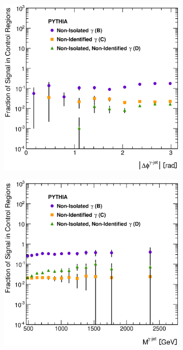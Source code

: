 \documentclass[12pt, twoside]{article}
\numberwithin{equation}{section}
\numberwithin{figure}{section}
\newenvironment{changemargin}[2]{%
\begin{list}{}{%
\setlength{\topsep}{0pt}%
\setlength{\leftmargin}{#1}%
\setlength{\rightmargin}{#2}%
\setlength{\listparindent}{\parindent}%
\setlength{\itemindent}{\parindent}%
\setlength{\parsep}{\parskip}%
}%
\item[]}{\end{list}}
\begin{document}
\begin{figure}
\begin{changemargin}{-1.0cm}{-0.75cm}
\begin{changemargin}{-0.75cm}{-1.0cm}
        \vspace{0.2cm}
        \begin{subfigure}[b]{0.37\textwidth}
            \includegraphics[width=\textwidth]{./images/SignalLeakageFractionsPythia/SLF-107.eps}
            \subcaption{}
            \label{fig:SLFDeltaPhiPhotonJet}
        \end{subfigure}
        \begin{subfigure}[b]{0.37\textwidth}
            \includegraphics[width=\textwidth]{./images/SignalLeakageFractionsPythia/SLF-108.eps}

\end{subfigure}
\end{changemargin}
\end{changemargin}
\end{figure}
\end{document}
